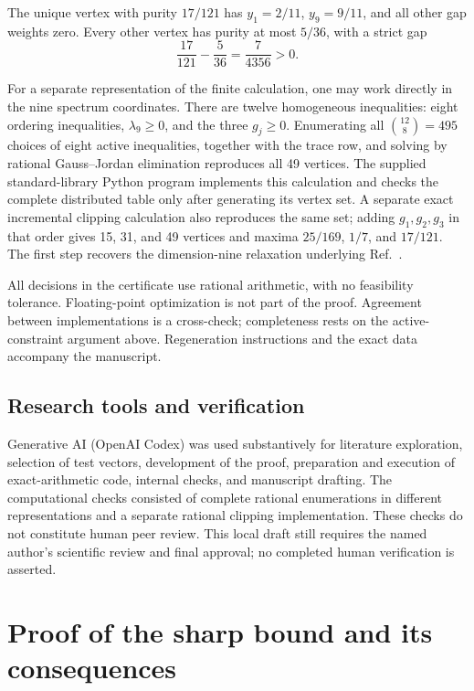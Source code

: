 \documentclass[aps,pra,onecolumn,notitlepage,10pt,amsmath,amssymb,longbibliography,nofootinbib]{revtex4-2}
\begin{document}
The unique vertex with purity $17/121$ has
$y_1=2/11$, $y_9=9/11$, and all other gap weights zero.
Every other vertex has purity at most $5/36$, with a strict gap
\begin{equation}
 \frac{17}{121}-\frac5{36}=\frac7{4356}>0.
 \label{eq:gap}
\end{equation}

For a separate representation of the finite calculation, one may work directly
in the nine spectrum coordinates. There are twelve homogeneous inequalities:
eight ordering inequalities, $\lambda_9\geq0$, and the three $g_j\geq0$.
Enumerating all $\binom{12}{8}=495$ choices of eight active inequalities,
together with the trace row, and solving by rational Gauss--Jordan elimination
reproduces all 49 vertices. The supplied standard-library Python program
implements this calculation and checks the complete distributed table only
after generating its vertex set. A separate exact incremental clipping
calculation also reproduces the same set; adding $g_1,g_2,g_3$ in that order
gives 15, 31, and 49 vertices and maxima $25/169$, $1/7$, and $17/121$.
The first step recovers the dimension-nine relaxation underlying
Ref.~\cite{Tran}.

All decisions in the certificate use rational arithmetic, with no feasibility
tolerance. Floating-point optimization is not part of the proof. Agreement
between implementations is a cross-check; completeness rests on the
active-constraint argument above. Regeneration instructions and the exact
data accompany the manuscript.

\subsection{Research tools and verification}

Generative AI (OpenAI Codex) was used substantively for literature exploration,
selection of test vectors, development of the proof, preparation and execution
of exact-arithmetic code, internal checks, and manuscript drafting.
The computational checks consisted of complete rational enumerations in
different representations and a separate rational clipping implementation.
These checks do not constitute human peer review. This local draft still
requires the named author's scientific review and final approval; no completed
human verification is asserted.

\section{Proof of the sharp bound and its consequences}
\end{document}
